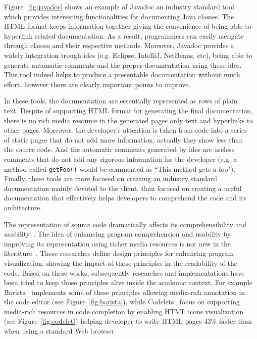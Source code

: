 Figure~\ref{fig:javadoc} shows an example of Javadoc an industry standard tool which provides interesting functionalities for documenting Java classes. The HTML format keeps information together giving the convenience of being able to hyperlink related documentation. As a result, programmers can easily navigate through classes and their respective methods. Moreover, Javadoc provides a widely integration trough \glspl{ide} (e.g. Eclipse, IntelliJ, NetBeans, etc), being able to generate automatic comments and the proper documentation using these \glspl{ide}. This tool indeed helps to produce a presentable documentation without much effort, however there are clearly important points to improve.

In these tools, the documentation are essentially represented as rows of plain text. Despite of supporting HTML format for generating the final documentation, there is no rich media resource in the generated pages only text and hyperlinks to other pages. Moreover, the developer's attention is taken from code into a series of static pages that do not add more information, actually they show less than the source code. And the automatic comments generated by \glspl{ide} are useless comments that do not add any rigorous information for the developer (e.g. a method called \texttt{getFoo()} would be commented as ``This method gets a foo"). Finally, these tools are more focused on creating an industry standard documentation mainly devoted to the client, than focused on creating a useful documentation that effectively helps developers to comprehend the code and its architecture.

The representation of source code dramatically affects its comprehensibility and usability~\citep{baecker1986design}. The idea of enhancing program comprehension and usability by improving its representation using richer media resources is not new in the literature~\citep{marcus1982graphic,baecker1986design,baecker1983enhancing}. These researches define design principles for enhancing program visualization, showing the impact of those principles in the readability of the code. Based on these works, subsequently researches and implementations have been tried to keep those principles alive inside the academic context. For example Barista~\citep{ko2006barista} implements some of these principles  allowing media-rich annotation in the code editor (see Figure~\ref{fig:barista}), while Codelets~\citep{oney2012codelets} focus on supporting media-rich resources in code completion by enabling HTML icons visualization (see Figure~\ref{fig:codelet}) helping developer to write HTML pages 43\% faster than when using a standard Web browser\citep{oney2012codelets}.

